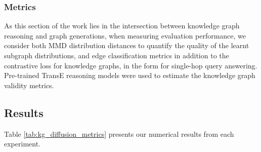 \subsubsection{Metrics}

As this section of the work lies in the intersection between knowledge graph reasoning and graph generations, when measuring evaluation performance, we consider both MMD distribution distances to quantify the quality of the learnt subgraph distributions, and edge classification metrics in addition to the contrastive loss for knowledge graphs, in the form for single-hop query answering. Pre-trained TransE \cite{bordes_translating_2013} reasoning models were used to estimate the knowledge graph validity metrics.

\subsection{Results}

Table \ref{tab:kg_diffusion_metrics} presents our numerical results from each experiment.


